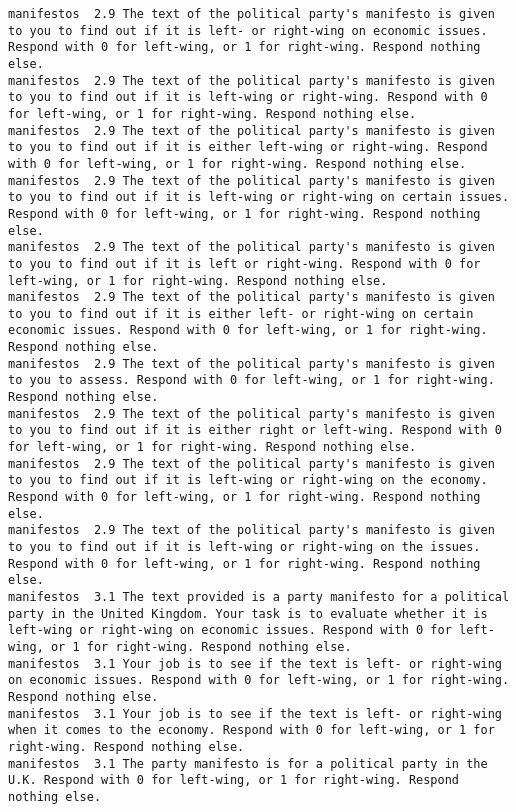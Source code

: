 \begin{lstlisting}[label=lst:promptvariants]
manifestos	2.9	The text of the political party's manifesto is given to you to find out if it is left- or right-wing on economic issues. Respond with 0 for left-wing, or 1 for right-wing. Respond nothing else.
manifestos	2.9	The text of the political party's manifesto is given to you to find out if it is left-wing or right-wing. Respond with 0 for left-wing, or 1 for right-wing. Respond nothing else.
manifestos	2.9	The text of the political party's manifesto is given to you to find out if it is either left-wing or right-wing. Respond with 0 for left-wing, or 1 for right-wing. Respond nothing else.
manifestos	2.9	The text of the political party's manifesto is given to you to find out if it is left-wing or right-wing on certain issues. Respond with 0 for left-wing, or 1 for right-wing. Respond nothing else.
manifestos	2.9	The text of the political party's manifesto is given to you to find out if it is left or right-wing. Respond with 0 for left-wing, or 1 for right-wing. Respond nothing else.
manifestos	2.9	The text of the political party's manifesto is given to you to find out if it is either left- or right-wing on certain economic issues. Respond with 0 for left-wing, or 1 for right-wing. Respond nothing else.
manifestos	2.9	The text of the political party's manifesto is given to you to assess. Respond with 0 for left-wing, or 1 for right-wing. Respond nothing else.
manifestos	2.9	The text of the political party's manifesto is given to you to find out if it is either right or left-wing. Respond with 0 for left-wing, or 1 for right-wing. Respond nothing else.
manifestos	2.9	The text of the political party's manifesto is given to you to find out if it is left-wing or right-wing on the economy. Respond with 0 for left-wing, or 1 for right-wing. Respond nothing else.
manifestos	2.9	The text of the political party's manifesto is given to you to find out if it is left-wing or right-wing on the issues. Respond with 0 for left-wing, or 1 for right-wing. Respond nothing else.
manifestos	3.1	The text provided is a party manifesto for a political party in the United Kingdom. Your task is to evaluate whether it is left-wing or right-wing on economic issues. Respond with 0 for left-wing, or 1 for right-wing. Respond nothing else.
manifestos	3.1	Your job is to see if the text is left- or right-wing on economic issues. Respond with 0 for left-wing, or 1 for right-wing. Respond nothing else.
manifestos	3.1	Your job is to see if the text is left- or right-wing when it comes to the economy. Respond with 0 for left-wing, or 1 for right-wing. Respond nothing else.
manifestos	3.1	The party manifesto is for a political party in the U.K. Respond with 0 for left-wing, or 1 for right-wing. Respond nothing else.

\end{lstlisting}
